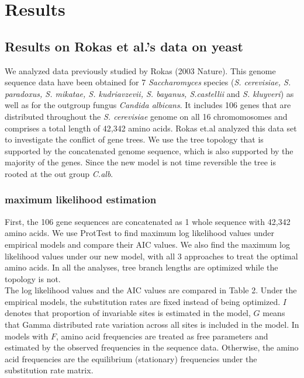 \documentclass[13pt]{article}
\begin{document}
\section{Results}


\subsection{Results on Rokas et al.'s data on yeast}
We analyzed data previously studied by Rokas (2003 Nature).
This genome sequence data have been obtained for 7 {\it Saccharomyces} species ({\it S. cerevisiae, S. paradoxus, S. mikatae, S. kudriavzevii, S. bayanus, S.castellii} and {\it S. kluyveri}) as well as for the outgroup fungus {\it Candida albicans}.
It includes 106 genes that are distributed throughout the {\it S. cerevisiae} genome on all 16 chromomosomes and comprises a total length of 42,342 amino acids.
Rokas et.al analyzed this data set to investigate the conflict of gene trees.
We use the tree topology that is supported by the concatenated genome sequence, which is also supported by the majority of the genes.
Since the new model is not time reversible the tree is rooted at the out group {\it C.alb}.\\

\subsubsection{maximum likelihood estimation}
First, the 106 gene sequences are concatenated as 1 whole sequence with 42,342 amino acids.
We use ProtTest to find maximum log likelihood values under empirical models and compare their AIC values.
We also find the maximum log likelihood values under our new model, with all 3 approaches to treat the optimal amino acids.
In all the analyses, tree branch lengths are optimized while the topology is not. \\

The log likelihood values and the AIC values are compared in Table 2.
Under the empirical models, the substitution rates are fixed instead of being optimized. 
$I$ denotes that proportion of invariable sites is estimated in the model, $G$ means that Gamma distributed rate variation across all sites is included in the model.
In models with $F$, amino acid frequencies are treated as free parameters and estimated by the observed frequencies in the sequence data.
Otherwise, the amino acid frequencies are the equilibrium (stationary) frequencies under the substitution rate matrix.\\
\end{document}
